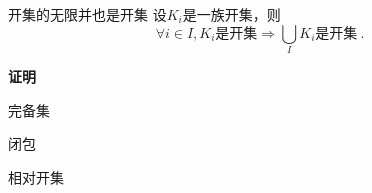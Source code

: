 \begin{theorem}{开集的无限并也是开集}
设${K_i}$是一族开集，则
\begin{equation}
\forall{i}\in{I},K_i\text{是开集}\Rightarrow{\bigcup_{I}K_i\text{是开集}}~.
\end{equation}
\end{theorem}

\textbf{证明}



\begin{definition}{完备集}

\end{definition}

\begin{definition}{闭包}
\end{definition}

\begin{definition}{相对开集}

\end{definition}